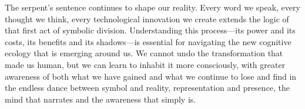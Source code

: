 The serpent's sentence continues to shape our reality. Every word we speak, every thought we think, every technological innovation we create extends the logic of that first act of symbolic division. Understanding this process—its power and its costs, its benefits and its shadows—is essential for navigating the new cognitive ecology that is emerging around us. We cannot undo the transformation that made us human, but we can learn to inhabit it more consciously, with greater awareness of both what we have gained and what we continue to lose and find in the endless dance between symbol and reality, representation and presence, the mind that narrates and the awareness that simply is.
